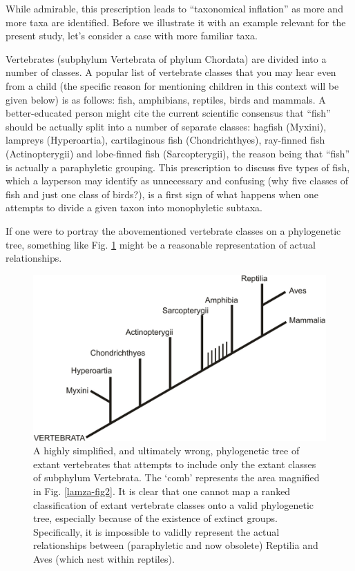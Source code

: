\begin{artengenv}
While admirable, this prescription leads to ``taxonomical inflation'' as more and more taxa are identified. Before we
illustrate it with an example relevant for the present study, let’s consider a case with more familiar taxa.

Vertebrates (subphylum Vertebrata of phylum Chordata) are divided into a number of classes. A popular list of vertebrate
classes that you may hear even from a child (the specific reason for mentioning children in this context will be given
below) is as follows: fish, amphibians, reptiles, birds and mammals. A better-educated person might cite the current
scientific consensus that ``fish'' should be actually split into a number of separate classes: hagfish (Myxini), lampreys
(Hyperoartia), cartilaginous fish (Chondrichthyes), ray-finned fish (Actinopterygii) and lobe-finned fish
(Sarcopterygii), the reason being that ``fish'' is actually a paraphyletic grouping. This prescription to discuss five
types of fish, which a layperson may identify as unnecessary and confusing (why five classes of fish and just one class
of birds?), is a first sign of what happens when one attempts to divide a given taxon into monophyletic subtaxa.

If one were to portray the abovementioned vertebrate classes on a phylogenetic tree, something like Fig. \ref{lamza-fig1} might be a
reasonable representation of actual relationships.

\begin{figure}[h]
	\centering
	\includegraphics[width=1\textwidth]{PAU_Lamza/Lamzaorg-img001.pdf}
	\caption{A highly simplified, and ultimately wrong, phylogenetic tree of extant vertebrates that attempts to
		include only the extant classes of subphylum Vertebrata. The ‘comb’ represents the area magnified in Fig. \ref{lamza-fig2}. It is
		clear that one cannot map a ranked classification of extant vertebrate classes onto a valid phylogenetic tree,
		especially because of the existence of extinct groups. Specifically, it is impossible to validly represent the actual
		relationships between (paraphyletic and now obsolete) Reptilia and Aves (which nest within reptiles).}
	\label{lamza-fig1}
\end{figure}


\end{artengenv}
